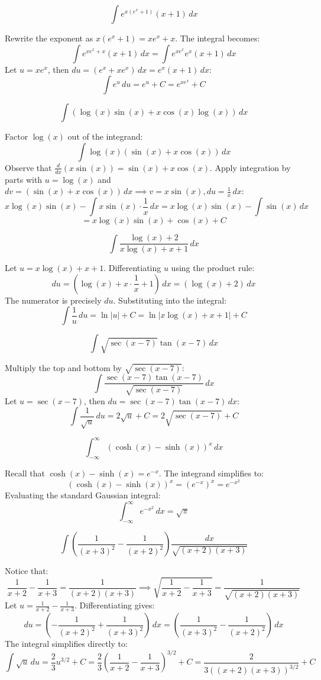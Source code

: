 \begin{questions}
\question
\[ \int e^{x(e^x + 1)} (x + 1) \, dx \]
\begin{solution}
Rewrite the exponent as $x(e^x + 1) = x e^x + x$. The integral becomes:
\[ \int e^{x e^x + x} (x + 1) \, dx = \int e^{x e^x} e^x (x + 1) \, dx \]
Let $u = x e^x$, then $du = (e^x + x e^x) \, dx = e^x(x + 1) \, dx$:
\[ \int e^u \, du = e^u + C = e^{x e^x} + C \]
\end{solution}

\question
\[ \int (\log(x)\sin(x) + x\cos(x)\log(x)) \, dx \]
\begin{solution}
Factor $\log(x)$ out of the integrand:
\[ \int \log(x) (\sin(x) + x\cos(x)) \, dx \]
Observe that $\frac{d}{dx}(x\sin(x)) = \sin(x) + x\cos(x)$.
Apply integration by parts with $u = \log(x)$ and $dv = (\sin(x) + x\cos(x)) \, dx \implies v = x\sin(x), du = \frac{1}{x} \, dx$:
\[ x\log(x)\sin(x) - \int x\sin(x) \cdot \frac{1}{x} \, dx = x\log(x)\sin(x) - \int \sin(x) \, dx \]
\[ = x\log(x)\sin(x) + \cos(x) + C \]
\end{solution}

\question
\[ \int \frac{\log(x) + 2}{x\log(x) + x + 1} \, dx \]
\begin{solution}
Let $u = x\log(x) + x + 1$. Differentiating $u$ using the product rule:
\[ du = \left( \log(x) + x \cdot \frac{1}{x} + 1 \right) \, dx = (\log(x) + 2) \, dx \]
The numerator is precisely $du$. Substituting into the integral:
\[ \int \frac{1}{u} \, du = \ln|u| + C = \ln|x\log(x) + x + 1| + C \]
\end{solution}

\question
\[ \int \sqrt{\sec(x-7)} \tan(x-7) \, dx \]
\begin{solution}
Multiply the top and bottom by $\sqrt{\sec(x-7)}$:
\[ \int \frac{\sec(x-7)\tan(x-7)}{\sqrt{\sec(x-7)}} \, dx \]
Let $u = \sec(x-7)$, then $du = \sec(x-7)\tan(x-7) \, dx$:
\[ \int \frac{1}{\sqrt{u}} \, du = 2\sqrt{u} + C = 2\sqrt{\sec(x-7)} + C \]
\end{solution}

\question
\[ \int_{-\infty}^{\infty} (\cosh(x) - \sinh(x))^x \, dx \]
\begin{solution}
Recall that $\cosh(x) - \sinh(x) = e^{-x}$.
The integrand simplifies to:
\[ (\cosh(x) - \sinh(x))^x = (e^{-x})^x = e^{-x^2} \]
Evaluating the standard Gaussian integral:
\[ \int_{-\infty}^{\infty} e^{-x^2} \, dx = \sqrt{\pi} \]
\end{solution}

\question
\[ \int \left(\frac{1}{(x+3)^2} - \frac{1}{(x+2)^2}\right) \frac{dx}{\sqrt{(x+2)(x+3)}} \]
\begin{solution}
Notice that:
\[ \frac{1}{x+2} - \frac{1}{x+3} = \frac{1}{(x+2)(x+3)} \implies \sqrt{\frac{1}{x+2} - \frac{1}{x+3}} = \frac{1}{\sqrt{(x+2)(x+3)}} \]
Let $u = \frac{1}{x+2} - \frac{1}{x+3}$. Differentiating gives:
\[ du = \left( -\frac{1}{(x+2)^2} + \frac{1}{(x+3)^2} \right) \, dx = \left( \frac{1}{(x+3)^2} - \frac{1}{(x+2)^2} \right) \, dx \]
The integral simplifies directly to:
\[ \int \sqrt{u} \, du = \frac{2}{3} u^{3/2} + C = \frac{2}{3} \left( \frac{1}{x+2} - \frac{1}{x+3} \right)^{3/2} + C = \frac{2}{3\left((x+2)(x+3)\right)^{3/2}} + C \]
\end{solution}

\end{questions}